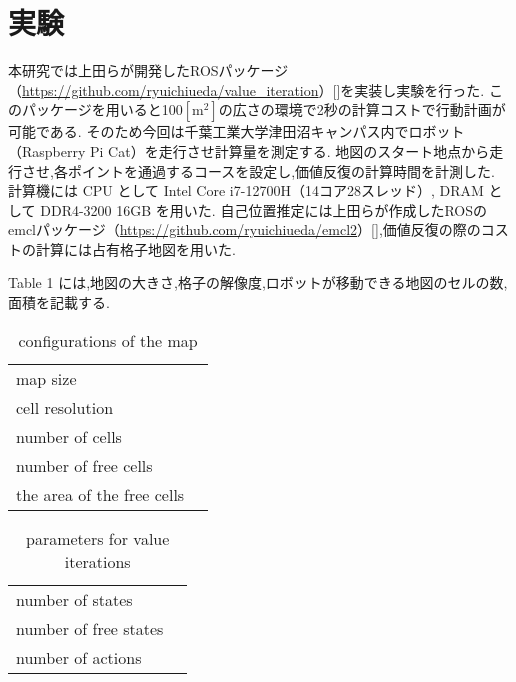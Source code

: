 \documentclass{jarticle}
\begin{document}

\section{実験}%
本研究では上田らが開発したROSパッケージ（\href{https://github.com/ryuichiueda/value_iteration}{https://github.com/ryuichiueda/value\_iteration}）[]を実装し実験を行った.
このパッケージを用いると100$\mathrm{[m^2]}$の広さの環境で2秒の計算コストで行動計画が可能である.
そのため今回は千葉工業大学津田沼キャンパス内でロボット（Raspberry Pi Cat）を走行させ計算量を測定する.
地図のスタート地点から走行させ,各ポイントを通過するコースを設定し,価値反復の計算時間を計測した.
計算機には CPU として Intel Core i7-12700H（14コア28スレッド）, DRAM として DDR4-3200 16GB を用いた.
自己位置推定には上田らが作成したROSのemclパッケージ（\href{https://github.com/ryuichiueda/emcl2}{https://github.com/ryuichiueda/emcl2}）[],価値反復の際のコストの計算には占有格子地図を用いた.

Table 1 には,地図の大きさ,格子の解像度,ロボットが移動できる地図のセルの数,面積を記載する.


\begin{table}[hbtp]
  \caption{conﬁgurations of the map}
  \centering
  \begin{tabular}{l|r}
    \hline
    map size & \\
    cell resolution &  \\
		number of cells & \\
    number of free cells & \\
		the area of the free cells & \\
    \hline
  \end{tabular}
\end{table}

\begin{table}[hbtp]
  \caption{parameters for value iterations}
  \centering
  \begin{tabular}{l|r}
    \hline
    number of states & \\
    number of free states &  \\
		number of actions & \\
    \hline
  \end{tabular}
\end{table}
\end{document}
